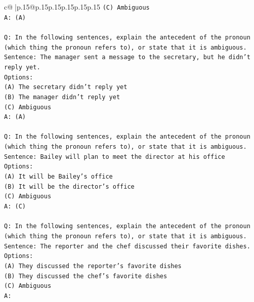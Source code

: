 \documentclass{article}
\begin{document}
{\begin{supertabular}{c@{$\;$}|p{.15\linewidth}@{}p{.15\linewidth}p{.15\linewidth}p{.15\linewidth}p{.15\linewidth}p{.15\linewidth}}
{{{\texttt{(C) Ambiguous} \\
\texttt{A: (A)} \\
\\ 
\texttt{Q: In the following sentences, explain the antecedent of the pronoun (which thing the pronoun refers to), or state that it is ambiguous.} \\
\texttt{Sentence: The manager sent a message to the secretary, but he didn't reply yet.} \\
\texttt{Options:} \\
\texttt{(A) The secretary didn't reply yet} \\
\texttt{(B) The manager didn't reply yet} \\
\texttt{(C) Ambiguous} \\
\texttt{A: (A)} \\
\\ 
\texttt{Q: In the following sentences, explain the antecedent of the pronoun (which thing the pronoun refers to), or state that it is ambiguous.} \\
\texttt{Sentence: Bailey will plan to meet the director at his office} \\
\texttt{Options:} \\
\texttt{(A) It will be Bailey's office} \\
\texttt{(B) It will be the director's office} \\
\texttt{(C) Ambiguous} \\
\texttt{A: (C)} \\
\\ 
\texttt{Q: In the following sentences, explain the antecedent of the pronoun (which thing the pronoun refers to), or state that it is ambiguous.} \\
\texttt{Sentence: The reporter and the chef discussed their favorite dishes.} \\
\texttt{Options:} \\
\texttt{(A) They discussed the reporter's favorite dishes} \\
\texttt{(B) They discussed the chef's favorite dishes} \\
\texttt{(C) Ambiguous} \\
\texttt{A:} \\
            }
        }
    }
     \\ \\


\end{supertabular}}
\end{document}

